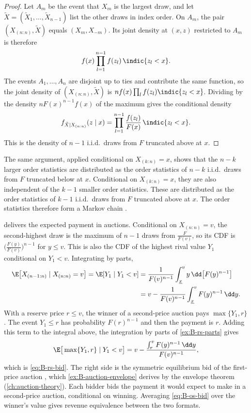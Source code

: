 \begin{proof}
Let $A_m$ be the event that $X_m$ is the largest draw, and let $\tilde X = (\tilde X_1, \dots, \tilde
X_{n-1})$ list the other draws in index order. On $A_m$, the pair $(X_{(n:n)}, \tilde X)$ equals
$(X_m, X_{-m})$. Its joint density at $(x, z)$ restricted to $A_m$ is therefore
\begin{equation*}
  f(x)\prod_{l=1}^{n-1}f(z_l)\,\indic\{z_l < x\}.
\end{equation*}
The events $A_1, \dots, A_n$ are disjoint up to ties and contribute the same function, so the joint density
of $(X_{(n:n)}, \tilde X)$ is $nf(x)\prod_l f(z_l)\indic\{z_l < x\}$. Dividing by the density $nF(x)^{n-1}f(x)$
of the maximum gives the conditional density
\begin{equation*}
  f_{\tilde X \mid X_{(n:n)}}(z \mid x) = \prod_{l=1}^{n-1}\frac{f(z_l)}{F(x)}\,\indic\{z_l < x\}.
\end{equation*}
This is the density of $n-1$ i.i.d.\ draws from $F$ truncated above at $x$.
\end{proof}

The same argument, applied conditional on $X_{(k:n)} = x$, shows that the $n-k$ larger order statistics are
distributed as the order statistics of $n-k$ i.i.d.\ draws from $F$ truncated below at $x$. Conditional on
$X_{(k:n)} = x$, they are also independent of the $k-1$ smaller order statistics. These are distributed as the
order statistics of $k-1$ i.i.d.\ draws from $F$ truncated above at $x$. The order statistics therefore form a Markov chain
\citep{ArnoldBalakrishnanNagaraja1992}.

 delivers the expected payment in auctions. Conditional on $X_{(n:n)} = v$, the
second-highest draw is the maximum of $n-1$ draws from $\frac{F}{F(v)}$, so its CDF is
$\big(\frac{F(y)}{F(v)}\big)^{n-1}$ for $y \leq v$. This is also the CDF of the highest rival value $Y_1$
conditional on $Y_1 < v$. Integrating by parts,
\begin{align*}
  \E\big[X_{(n-1:n)} \mid X_{(n:n)} = v\big] = \E[Y_1 \mid Y_1 < v]
  &= \frac{1}{F(v)^{n-1}}\int_{\underline x}^{v}y\,\dd\big[F(y)^{n-1}\big] \\
  &= v - \frac{1}{F(v)^{n-1}}\int_{\underline x}^{v}F(y)^{n-1}\,\dd y.
\end{align*}
With a reserve price $r \leq v$, the winner of a second-price auction pays $\max\{Y_1, r\}$. The event
$Y_1 \leq r$ has probability $F(r)^{n-1}$ and then the payment is $r$. Adding this term to the integral above,
the integration by parts of \cref{ex:B-rs-parts} gives
\begin{equation}\label{eq:B-os-bid}
  \E\big[\max\{Y_1, r\} \mid Y_1 < v\big] = v - \frac{\int_r^vF(y)^{n-1}\,\dd y}{F(v)^{n-1}},
\end{equation}
which is \eqref{eq:B-rs-bid}. The right side is the symmetric equilibrium bid of the first-price auction
\citep{RileySamuelson1981}, which \cref{ex:B-auction-envelope} derives by the envelope theorem
(\cref{ch:auction-theory}). Each bidder bids the payment it would expect to make in a second-price auction,
conditional on winning. Averaging \eqref{eq:B-os-bid} over the winner's value gives revenue equivalence
between the two formats.

